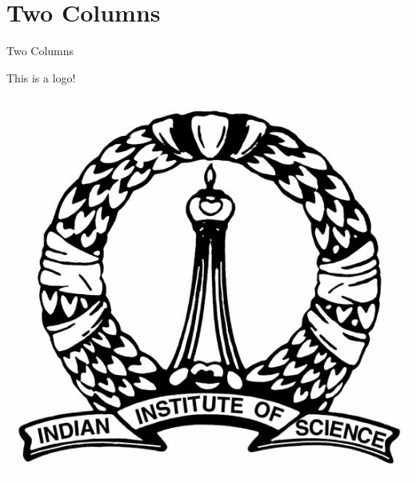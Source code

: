 \documentclass[handout]{beamer} %
\begin{document}
\section{Two Columns}
\begin{frame}{Two Columns}
	\begin{minipage}[l]{0.45\textwidth}
		This is a logo!
	\end{minipage}
	\hfill
	\begin{minipage}[c]{0.45\linewidth}
			\includegraphics[scale=0.32]{IISc_logo.jpg}
	\end{minipage}
\end{frame}
\end{document}
